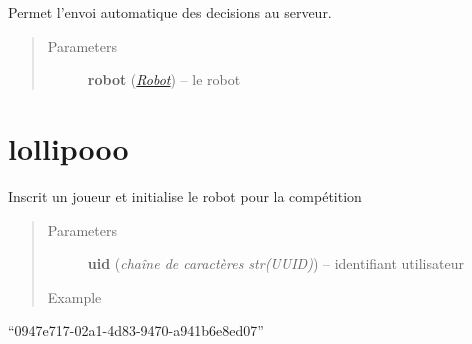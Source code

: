 \documentclass[letterpaper,10pt,english]{sphinxmanual}
\begin{document}

\begin{fulllineitems}
\label{index:graphique_lolipooo.sendDecisions}
Permet l'envoi automatique des decisions au serveur.
\begin{quote}\begin{description}
\item[{Parameters}] \leavevmode
\textbf{robot} ({\hyperref[index:module-Robot]{\emph{Robot}}}) -- le robot

\end{description}\end{quote}

\end{fulllineitems}



\chapter{lollipooo}
\label{index:lollipooo}

\begin{fulllineitems}
\label{index:lolipooo.register_pooo}
Inscrit un joueur et initialise le robot pour la compétition
\begin{quote}\begin{description}
\item[{Parameters}] \leavevmode
\textbf{uid} (\emph{chaîne de caractères str(UUID)}) -- identifiant utilisateur

\item[{Example}] \leavevmode
\end{description}\end{quote}

``0947e717-02a1-4d83-9470-a941b6e8ed07''

\end{fulllineitems}

\end{document}
